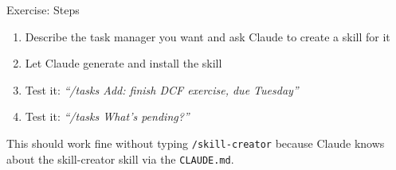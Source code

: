\documentclass[aspectratio=169]{beamer}
\begin{document}
\begin{frame}{Exercise: Steps}
\begin{enumerate}
  \item Describe the task manager you want and ask Claude to create a skill for it
  \item Let Claude generate and install the skill
  \item Test it: \textit{``/tasks Add: finish DCF exercise, due Tuesday''}
  \item Test it: \textit{``/tasks What's pending?''}
\end{enumerate}
\vspace{0.3cm}
This should work fine without typing \texttt{/skill-creator} because Claude knows about the skill-creator skill via the \texttt{CLAUDE.md}.
\end{frame}
\end{document}
